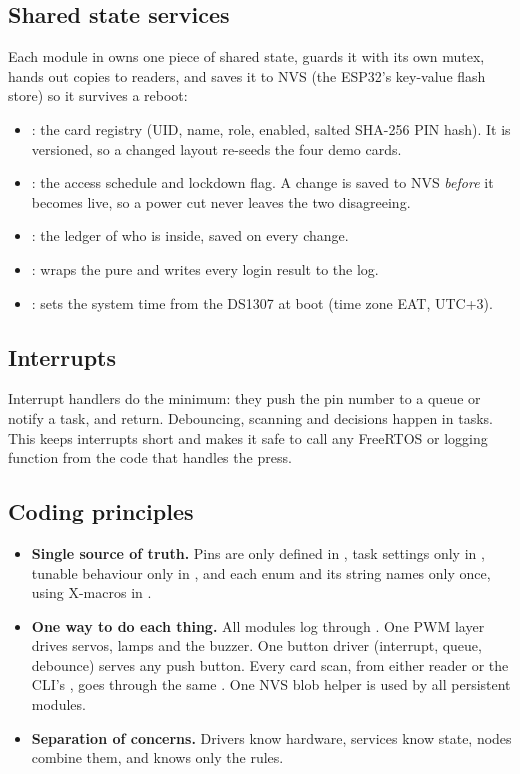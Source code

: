 \subsection{Shared state services}
Each module in  owns one piece of shared state, guards it with its own
mutex, hands out copies to readers, and saves it to NVS (the ESP32's key-value flash store) so
it survives a reboot:
\begin{itemize}
  \item {}: the card registry (UID, name, role, enabled, salted SHA-256 PIN hash). It is
        versioned, so a changed layout re-seeds the four demo cards.
  \item {}: the access schedule and lockdown flag. A change is saved to NVS
        \emph{before} it becomes live, so a power cut never leaves the two disagreeing.
  \item {}: the ledger of who is inside, saved on every change.
  \item {}: wraps the pure  and writes every login result to the log.
  \item {}: sets the system time from the DS1307 at boot (time zone EAT, UTC+3).
\end{itemize}

\subsection{Interrupts}
Interrupt handlers do the minimum: they push the pin number to a queue or notify a task, and
return. Debouncing, scanning and decisions happen in tasks. This keeps interrupts short and makes it
safe to call any FreeRTOS or logging function from the code that handles the press.

\subsection{Coding principles}
\begin{itemize}
  \item \textbf{Single source of truth.} Pins are only defined in , task settings
        only in , tunable behaviour only in , and each
        enum and its string names only once, using X-macros in .
  \item \textbf{One way to do each thing.} All modules log through
        . One PWM layer drives servos, lamps and the buzzer. One
        button driver (interrupt, queue, debounce) serves any push button. Every card scan, from
        either reader or the CLI's , goes through the same . One NVS
        blob helper is used by all persistent modules.
  \item \textbf{Separation of concerns.} Drivers know hardware, services know state, nodes combine
        them, and  knows only the rules.
\end{itemize}

